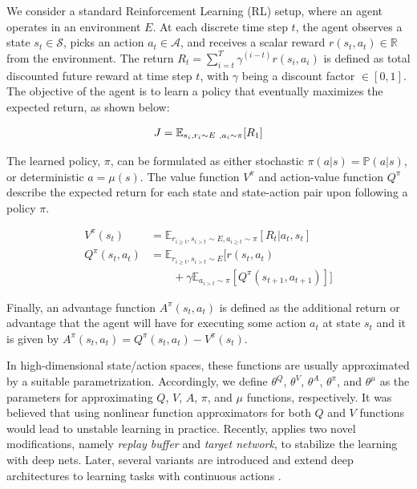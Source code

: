 \documentclass[../thesis.tex]{subfiles}
\begin{document}
We consider a standard Reinforcement Learning (RL) setup, where an agent operates in an environment ${E}$. At each discrete time step $t$, the agent observes a state $s_t \in \mathcal{S}$, picks an action $a_t \in \mathcal{A}$, and receives a scalar reward $r(s_t, a_t) \in \mathbb{R}$ from the environment. The return $R_t = \sum^T_{i=t} \gamma^{(i-t)}r(s_i,a_i)$ is defined as total discounted future reward at time step $t$, with $\gamma$ being a discount factor $\in [0,1]$. The objective of the agent is to learn a policy that eventually maximizes the expected return, as shown below:
 
\begin{align}
\centering
J = \mathbb{E}_{s_i, r_i \sim E~, a_i \sim \pi}[R_1] \label{equ:obj-func}
\end{align}
 
The learned policy, $\pi$, can be formulated as either stochastic $\pi(a|s) = \mathbb{P}(a|s)$, or deterministic $a = \mu(s)$. The value function $V^{\pi}$ and action-value function $Q^{\pi}$ describe the expected return for each state and state-action pair upon following a policy $\pi$.
 
\begin{align}
V^\pi(s_t) &= \mathbb{E}_{r_{i \geq t}, s_{i > t} \sim E, a_{i \geq t} \sim \pi} [R_t | a_t, s_t] \\
Q^\pi(s_t, a_t) &= \mathbb{E}_{r_{i \geq t}, s_{i > t} \sim E} [r(s_t, a_t) \nonumber \\
&\qquad + \gamma \mathbb{E}_{a_{i > t} \sim \pi} [Q^\pi(s_{t+1}, a_{t+1})]]
\end{align}
 
Finally, an advantage function $A^{\pi}(s_t,a_t)$ is defined as the additional return or advantage that the agent will have for executing some action $a_t$ at state $s_t$ and it is given by $A^{\pi}(s_t,a_t) = Q^\pi(s_t, a_t) - V^\pi(s_t)$.
 
 
In high-dimensional state/action spaces, these functions are usually approximated by a suitable parametrization. 
Accordingly, we define $\theta^Q$, $\theta^V$, $\theta^A$, $\theta^\pi$, and $\theta^\mu$ as the parameters for approximating $Q$, $V$, $A$, $\pi$, and $\mu$ functions, respectively. 
It was believed that using nonlinear function approximators for both $Q$ and $V$ functions would lead to unstable learning in practice. 
Recently, \citet{mnih2013playing} applies two novel modifications, namely \textit{replay buffer} and \textit{target network}, to stabilize the learning with deep nets. 
Later, several variants are introduced and extend deep architectures to learning tasks with continuous actions \cite{DBLP:journals/corr/LillicrapHPHETS15,A3C,CDQN,TRPO}.
 
\end{document}
